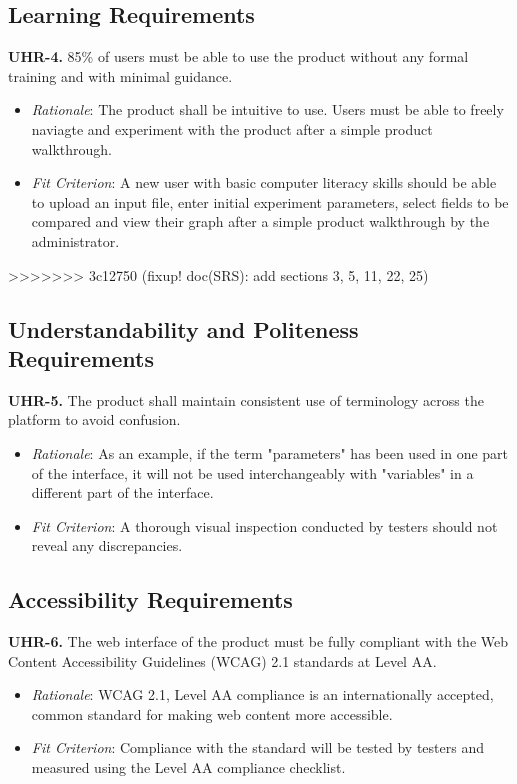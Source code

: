 \documentclass[12pt]{article}
\begin{document}
\subsection{Learning Requirements}
\textbf{UHR-4.} 85\% of users must be able to use the product without any formal training and with minimal guidance.
\begin{itemize}
  \item \emph{Rationale}: The product shall be intuitive to use. Users must be able to freely naviagte and experiment with the product after a simple product walkthrough.
  \item \emph{Fit Criterion}: A new user with basic computer literacy skills should be able to upload an input file, enter initial experiment parameters, select fields to be compared and view their graph
  after a simple product walkthrough by the administrator.
\end{itemize}
>>>>>>> 3c12750 (fixup! doc(SRS): add sections 3, 5, 11, 22, 25)

\subsection{Understandability and Politeness Requirements}
\textbf{UHR-5.} The product shall maintain consistent use of terminology across the platform to avoid confusion.
\begin{itemize}
  \item \emph{Rationale}: As an example, if the term "parameters" has been used in one part of the interface, it will not be used interchangeably with "variables" in a different part of the interface.
  \item \emph{Fit Criterion}: A thorough visual inspection conducted by testers should not reveal any discrepancies.
\end{itemize}

\subsection{Accessibility Requirements}
\textbf{UHR-6.} The web interface of the product must be fully compliant with the Web Content Accessibility Guidelines (WCAG) 2.1 standards at Level AA.
\begin{itemize}
  \item \emph{Rationale}: WCAG 2.1, Level AA compliance is an internationally accepted, common standard for making web content more accessible.
  \item \emph{Fit Criterion}: Compliance with the standard will be tested by testers and measured using the Level AA compliance checklist.
\end{itemize}
\end{document}
